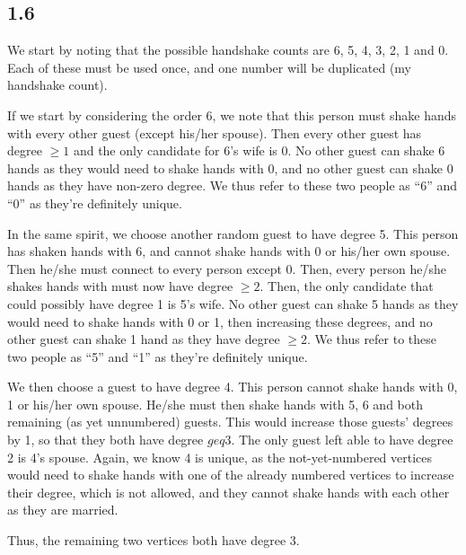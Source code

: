 \documentclass[a4paper]{article}
\begin{document}
\subsection*{1.6}

We start by noting that the possible handshake counts are 6, 5, 4, 3, 2, 1 and 0.
Each of these must be used once, and one number will be duplicated (my handshake count).


If we start by considering the order 6, we note that this person must shake hands with every
other guest (except his/her spouse). Then every other guest has degree $\geq 1$ and the only
candidate for 6's wife is 0. No other guest can shake 6 hands as they would need to shake hands
with 0, and no other guest can shake 0 hands as they have non-zero degree. We thus refer to these two people 
as ``6'' and ``0'' as they're definitely unique.

In the same spirit, we choose another random guest to have degree 5. This person has shaken hands
with 6, and cannot shake hands with 0 or his/her own spouse. Then he/she must connect to every person except 0.
Then, every person he/she shakes hands with must now have degree $\geq 2$. Then, the only candidate that could
possibly have degree 1 is 5's wife. No other guest can shake 5 hands as they would need to shake hands
with 0 or 1, then increasing these degrees, and no other guest can shake 1 hand as they have degree $\geq 2$. 
We thus refer to these two people as ``5'' and ``1'' as they're definitely unique.

We then choose a guest to have degree 4. This person cannot shake hands with 0, 1 or his/her own spouse. He/she
must then shake hands with 5, 6 and both remaining (as yet unnumbered) guests. This would increase those guests'
degrees by 1, so that they both have degree $geq 3$. The only guest left able to have degree 2 is 4's spouse.
Again, we know 4 is unique, as the not-yet-numbered vertices would need to shake hands with one of the already 
numbered vertices to increase their degree, which is not allowed, and they cannot shake hands with each other
as they are married.

Thus, the remaining two vertices both have degree 3.

\end{document}

